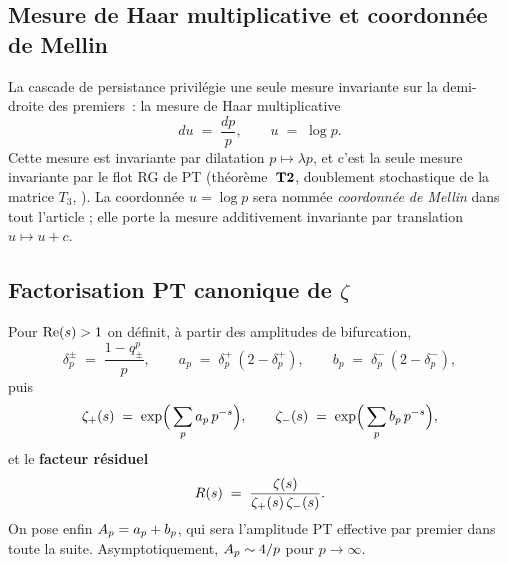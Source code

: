 \subsection{Mesure de Haar multiplicative et coordonnée de Mellin}
\label{sec:haar}

La cascade de persistance privilégie une seule mesure invariante sur la
demi-droite des premiers~: la mesure de Haar multiplicative
\begin{equation}
du \;=\; \dfrac{dp}{p}, \qquad u \;=\; \log p.
\label{eq:haar_mult}
\end{equation}
Cette mesure est invariante par dilatation $p \mapsto \lambda p$, et c'est
la seule mesure invariante par le flot RG de PT (théorème~$\textbf{T2}$,
doublement stochastique de la matrice $T_3$, \cite{PT_M1}). La
coordonnée $u = \log p$ sera nommée \emph{coordonnée de Mellin} dans tout
l'article ; elle porte la mesure additivement invariante par translation
$u \mapsto u + c$.

\subsection{Factorisation PT canonique de $\zeta$}
\label{sec:factorisation}

Pour $\operatorname{Re}(s) > 1$ on définit, à partir des amplitudes de bifurcation,
\begin{equation}
\delta_p^{\pm} \;=\; \dfrac{1 - q_{\pm}^{p}}{p}, \qquad
a_p \;=\; \delta_p^{+}\,(2 - \delta_p^{+}), \qquad
b_p \;=\; \delta_p^{-}\,(2 - \delta_p^{-}),
\label{eq:apbp}
\end{equation}
puis
\begin{equation}
\zeta_{+}(s) \;=\; \exp\!\Big(\sum_{p} a_p\,p^{-s}\Big), \qquad
\zeta_{-}(s) \;=\; \exp\!\Big(\sum_{p} b_p\,p^{-s}\Big),
\label{eq:zetapm}
\end{equation}
et le \textbf{facteur résiduel}
\begin{equation}
R(s) \;=\; \dfrac{\zeta(s)}{\zeta_{+}(s)\,\zeta_{-}(s)}.
\label{eq:Rres_def}
\end{equation}
On pose enfin $A_p = a_p + b_p$, qui sera l'amplitude PT effective par
premier dans toute la suite. Asymptotiquement, $A_p \sim 4/p$ pour
$p \to \infty$.

